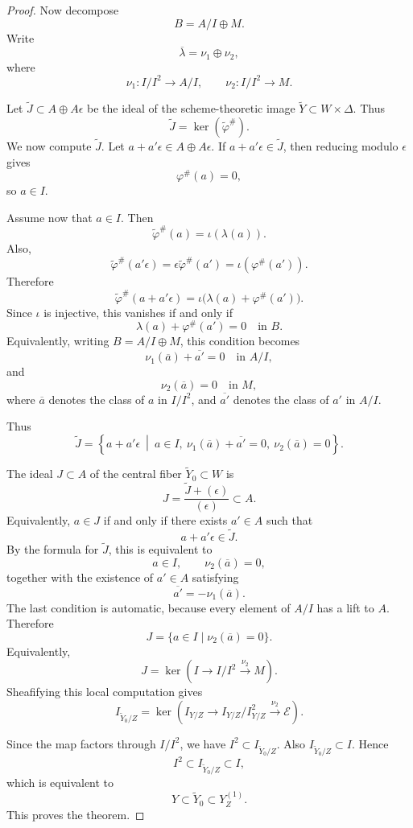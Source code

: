 \documentclass[11pt,twoside]{amsart}
\theoremstyle{plain}
\numberwithin{equation}{section}
\theoremstyle{definition}
\begin{document}
\begin{proof}
Now decompose
\[
    B=A/I\oplus M.
\]
Write
\[
    \overline{\lambda}=\nu_1\oplus \nu_2,
\]
where
\[
    \nu_1:I/I^2\to A/I,
    \qquad
    \nu_2:I/I^2\to M.
\]

Let \(\widetilde J\subset A\oplus A\epsilon\) be the ideal of the scheme-theoretic image
\(\widetilde Y\subset W\times\Delta\). Thus
\[
    \widetilde J=\ker(\widetilde\varphi^\#).
\]
We now compute \(\widetilde J\). Let \(a+a'\epsilon\in A\oplus A\epsilon\). If
\(a+a'\epsilon\in\widetilde J\), then reducing modulo \(\epsilon\) gives
\[
    \varphi^\#(a)=0,
\]
so \(a\in I\).

Assume now that \(a\in I\). Then
\[
    \widetilde\varphi^\#(a)=\iota(\lambda(a)).
\]
Also,
\[
    \widetilde\varphi^\#(a'\epsilon)
    =
    \epsilon\widetilde\varphi^\#(a')
    =
    \iota(\varphi^\#(a')).
\]
Therefore
\[
    \widetilde\varphi^\#(a+a'\epsilon)
    =
    \iota\bigl(\lambda(a)+\varphi^\#(a')\bigr).
\]
Since \(\iota\) is injective, this vanishes if and only if
\[
    \lambda(a)+\varphi^\#(a')=0
    \quad\text{in }B.
\]
Equivalently, writing \(B=A/I\oplus M\), this condition becomes
\[
    \nu_1(\overline a)+\overline{a'}=0
    \quad\text{in }A/I,
\]
and
\[
    \nu_2(\overline a)=0
    \quad\text{in }M,
\]
where \(\overline a\) denotes the class of \(a\) in \(I/I^2\), and
\(\overline{a'}\) denotes the class of \(a'\) in \(A/I\).

Thus
\[
    \widetilde J
    =
    \left\{
        a+a'\epsilon
        \ \middle|\
        a\in I,\ 
        \nu_1(\overline a)+\overline{a'}=0,\ 
        \nu_2(\overline a)=0
    \right\}.
\]

The ideal \(J\subset A\) of the central fiber \(\widetilde Y_0\subset W\) is
\[
    J=
    \frac{\widetilde J+(\epsilon)}{(\epsilon)}
    \subset A.
\]
Equivalently, \(a\in J\) if and only if there exists \(a'\in A\) such that
\[
    a+a'\epsilon\in \widetilde J.
\]
By the formula for \(\widetilde J\), this is equivalent to
\[
    a\in I,\qquad \nu_2(\overline a)=0,
\]
together with the existence of \(a'\in A\) satisfying
\[
    \overline{a'}=-\nu_1(\overline a).
\]
The last condition is automatic, because every element of \(A/I\) has a lift to \(A\).
Therefore
\[
    J
    =
    \{a\in I\mid \nu_2(\overline a)=0\}.
\]
Equivalently,
\[
    J=
    \ker\left(
        I\to I/I^2\xrightarrow{\nu_2}M
    \right).
\]
Sheafifying this local computation gives
\[
    I_{\widetilde Y_0/Z}
    =
    \ker\left(
        I_{Y/Z}
        \longrightarrow
        I_{Y/Z}/I_{Y/Z}^2
        \xrightarrow{\nu_2}
        \mathcal E
    \right).
\]

Since the map factors through \(I/I^2\), we have \(I^2\subset I_{\widetilde Y_0/Z}\).
Also \(I_{\widetilde Y_0/Z}\subset I\). Hence
\[
    I^2\subset I_{\widetilde Y_0/Z}\subset I,
\]
which is equivalent to
\[
    Y\subset \widetilde Y_0\subset Y^{(1)}_Z.
\]
This proves the theorem.
\end{proof}
\end{document}
